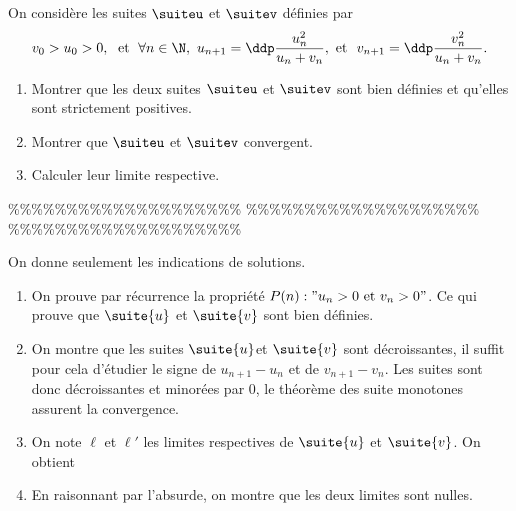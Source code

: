 


\begin{exercice}
On consid\`ere les suites $\suiteu$ et $\suitev$ d\'efinies par
$$v_0>u_0>0, \; \textmd{ et } \; \forall n\in\N,\ u_{n+1}=\ddp\frac{u_n^2}{u_n+v_n}, \textmd{ et } \ v_{n+1}=\ddp\frac{v_n^2}{u_n+v_n}.$$
\begin{enumerate}
 \item
Montrer que les deux suites $\suiteu$ et $\suitev$ sont bien d\'efinies et qu'elles sont strictement positives. 
\item 
Montrer que $\suiteu$ et $\suitev$ convergent.
\item 
Calculer leur limite respective.

\end{enumerate}
\end{exercice}


\%\%\%\%\%\%\%\%\%\%\%\%\%\%\%\%\%\%\%\%
\%\%\%\%\%\%\%\%\%\%\%\%\%\%\%\%\%\%\%\%
\%\%\%\%\%\%\%\%\%\%\%\%\%\%\%\%\%\%\%\%



\begin{correction}
On donne seulement les indications de solutions. 
	\begin{enumerate}
		\item On prouve par récurrence la propriété $P(n): " u_n>0 \text{ et } v_n>0"$. Ce qui prouve que $\suite{u}$ et $\suite{v}$ sont bien définies. 
		\item On montre  que les suites $\suite{u}$et $\suite{v}$ sont  décroissantes, il suffit pour cela d'étudier le signe de $u_{n+1}-u_n$  et de $v_{n+1}-v_n$. Les suites sont donc décroissantes et minorées par 0, le théorème  des suite monotones assurent la convergence. 
		\item On note $\ell$ et $\ell'$ les limites respectives de $\suite{u}$ et $\suite{v} $. On obtient 
		\item En raisonnant par l'absurde, on montre que les deux limites sont nulles. 

	\end{enumerate}
\end{correction}